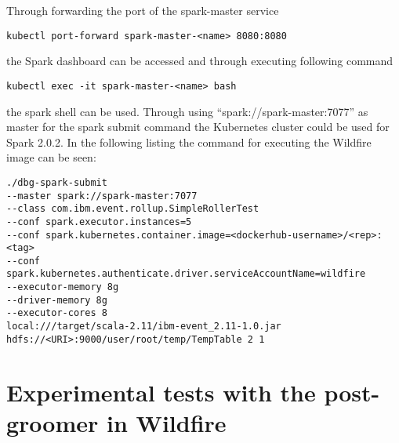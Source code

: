 Through forwarding the port of the spark-master service 
\begin{lstlisting}[caption={Forward spark-master service pod},captionpos=b]
kubectl port-forward spark-master-<name> 8080:8080
\end{lstlisting}
the Spark dashboard can be accessed and through executing following command
\begin{lstlisting}[caption={Access spark shell},captionpos=b]
kubectl exec -it spark-master-<name> bash
\end{lstlisting}
the spark shell can be used. Through using ``spark://spark-master:7077'' as master for the spark submit command the Kubernetes cluster could be used for Spark 2.0.2. In the following listing the command for executing the Wildfire image can be seen:
\begin{lstlisting}[caption={Execute Wildfire image with Kubernetes},captionpos=b]
./dbg-spark-submit 
--master spark://spark-master:7077 
--class com.ibm.event.rollup.SimpleRollerTest 
--conf spark.executor.instances=5 
--conf spark.kubernetes.container.image=<dockerhub-username>/<rep>:<tag> 
--conf spark.kubernetes.authenticate.driver.serviceAccountName=wildfire 
--executor-memory 8g 
--driver-memory 8g 
--executor-cores 8 
local:///target/scala-2.11/ibm-event_2.11-1.0.jar 
hdfs://<URI>:9000/user/root/temp/TempTable 2 1
\end{lstlisting}

\section{Experimental tests with the post-groomer in Wildfire}

